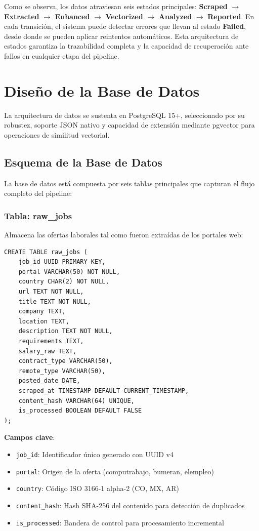 Como se observa, los datos atraviesan seis estados principales: \textbf{Scraped} $\rightarrow$ \textbf{Extracted} $\rightarrow$ \textbf{Enhanced} $\rightarrow$ \textbf{Vectorized} $\rightarrow$ \textbf{Analyzed} $\rightarrow$ \textbf{Reported}. En cada transición, el sistema puede detectar errores que llevan al estado \textbf{Failed}, desde donde se pueden aplicar reintentos automáticos. Esta arquitectura de estados garantiza la trazabilidad completa y la capacidad de recuperación ante fallos en cualquier etapa del pipeline.

\section{Diseño de la Base de Datos}

La arquitectura de datos se sustenta en PostgreSQL 15+, seleccionado por su robustez, soporte JSON nativo y capacidad de extensión mediante pgvector para operaciones de similitud vectorial.

\subsection{Esquema de la Base de Datos}

La base de datos está compuesta por seis tablas principales que capturan el flujo completo del pipeline:

\subsubsection{Tabla: raw\_jobs}

Almacena las ofertas laborales tal como fueron extraídas de los portales web:

\begin{verbatim}
CREATE TABLE raw_jobs (
    job_id UUID PRIMARY KEY,
    portal VARCHAR(50) NOT NULL,
    country CHAR(2) NOT NULL,
    url TEXT NOT NULL,
    title TEXT NOT NULL,
    company TEXT,
    location TEXT,
    description TEXT NOT NULL,
    requirements TEXT,
    salary_raw TEXT,
    contract_type VARCHAR(50),
    remote_type VARCHAR(50),
    posted_date DATE,
    scraped_at TIMESTAMP DEFAULT CURRENT_TIMESTAMP,
    content_hash VARCHAR(64) UNIQUE,
    is_processed BOOLEAN DEFAULT FALSE
);
\end{verbatim}

\textbf{Campos clave}:
\begin{itemize}
    \item \texttt{job\_id}: Identificador único generado con UUID v4
    \item \texttt{portal}: Origen de la oferta (computrabajo, bumeran, elempleo)
    \item \texttt{country}: Código ISO 3166-1 alpha-2 (CO, MX, AR)
    \item \texttt{content\_hash}: Hash SHA-256 del contenido para detección de duplicados
    \item \texttt{is\_processed}: Bandera de control para procesamiento incremental
\end{itemize}

